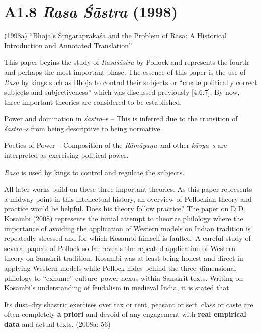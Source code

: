 \section*{A1.8 \textit{Rasa Śāstra} (1998)}

(1998a) “Bhoja's Śṛṅgāraprakāśa and the Problem of Rasa: A Historical Introduction and Annotated Translation”

This paper begins the study of \textit{Rasaśāstra} by Pollock and represents the fourth and perhaps the most important phase. The essence of this paper is the use of \textit{Rasa} by kings such as Bhoja to control their subjects or “create politically correct subjects and subjectiveness” which was discussed previously [4.6.7]. By now, three important theories are considered to be established.

\item Power and domination in \textit{śāstra}–s – This is inferred due to the transition of \textit{śāstra–s }from being descriptive to being normative.

 \item Poetics of Power – Composition of the \textit{Rāmāyaṇa} and other\textit{ kāvya–s }are interpreted as exercising political power.

 \item \textit{Rasa} is used by kings to control and regulate the subjects.

All later works build on these three important theories. As this paper represents a midway point in this intellectual history, an overview of Pollockian theory and practice would be helpful. Does his theory follow practice? The paper on D.D. Kosambi (2008) represents the initial attempt to theorize philology where the importance of avoiding the application of Western models on Indian tradition is repeatedly stressed and for which Kosambi himself is faulted. A careful study of several papers of Pollock so far reveals the repeated application of Western theory on Sanskrit tradition. Kosambi was at least being honest and direct in applying Western models while Pollock hides behind the three–dimensional philology to “exhume” culture–power nexus within Sanskrit texts. Writing on Kosambi’s understanding of feudalism in medieval India, it is stated that

\begin{myquote}
Its dust–dry shastric exercises over tax or rent, peasant or serf, class or caste are often completely \textbf{a priori} and devoid of any engagement with \textbf{real empirical data} and actual texts. (2008a: 56)
\end{myquote}

